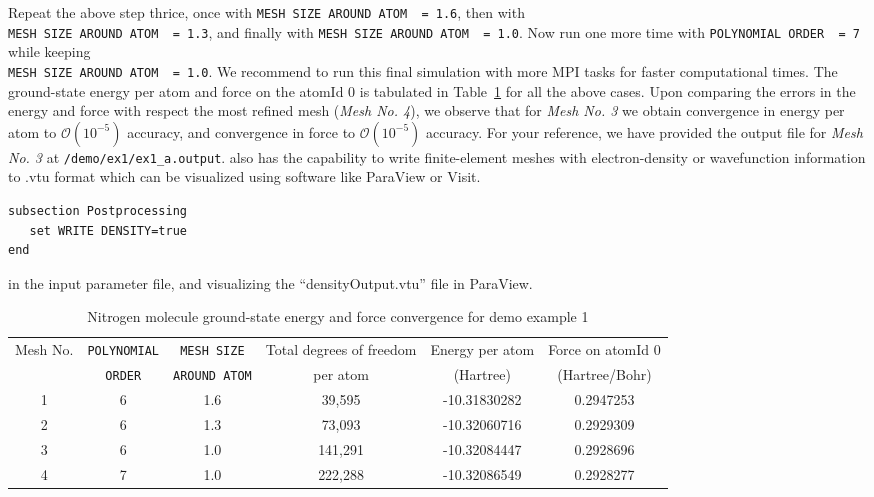 \begin{enumerate}
Repeat the above step thrice, once with \verb|MESH SIZE AROUND ATOM  = 1.6|, then with\\ \verb|MESH SIZE AROUND ATOM  = 1.3|, and finally with \verb|MESH SIZE AROUND ATOM  = 1.0|. Now run one more time with \verb|POLYNOMIAL ORDER  = 7| while keeping \\ \verb|MESH SIZE AROUND ATOM  = 1.0|. We recommend to run this final simulation with more MPI tasks for faster computational times. The ground-state energy per atom and force on the atomId 0 is tabulated in Table~\ref{tab:table1} for all the above cases. Upon comparing the errors in the energy and force with respect the most refined mesh (\emph{Mesh No. 4}), we observe that for \emph{Mesh No. 3} we obtain convergence in energy per atom to $\mathcal{O}(10^{-5})$ accuracy, and convergence in force to $\mathcal{O}(10^{-5})$ accuracy. For your reference, we have provided the output file for \emph{Mesh No. 3} at \verb|/demo/ex1/ex1_a.output|. \dftfe{} also has the capability to write finite-element meshes with electron-density or wavefunction information to .vtu format which can be visualized using software like ParaView or Visit.
\begin{verbatim}
subsection Postprocessing
   set WRITE DENSITY=true
end
\end{verbatim}
in the input parameter file, and visualizing the ``densityOutput.vtu'' file in ParaView.
\begin{table}[h!]
  \begin{center}
\small	  
    \caption{Nitrogen molecule ground-state energy and force convergence for demo example 1}
    \label{tab:table1}
    \begin{tabular}{c|c|c|c|c|c}
	    \hline\hline
	    Mesh No. &\verb|POLYNOMIAL| &\verb|MESH SIZE| & Total degrees of freedom& Energy per atom & Force on atomId 0\\
	    &\verb|ORDER| &\verb|AROUND ATOM| & per atom  & (Hartree) & (Hartree/Bohr) \\
      \hline\hline
	    1& 6 & 1.6 & 39,595 & -10.31830282 &  0.2947253\\
	    2&6 & 1.3 &  73,093&  -10.32060716 &  0.2929309\\
	    3&6 & 1.0 & 141,291 & -10.32084447 &  0.2928696\\
	    4&7 & 1.0 & 222,288 & -10.32086549 &  0.2928277\\
	  \hline\hline
    \end{tabular}
  \end{center}
\end{table}


\end{enumerate}

